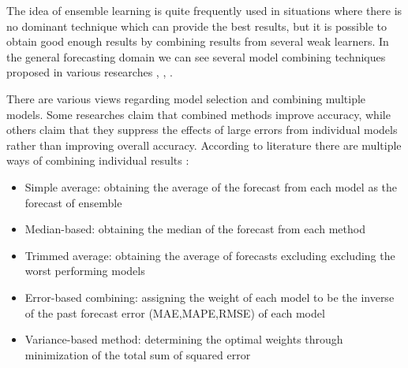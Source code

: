 The idea of ensemble learning is quite frequently used in situations where there is no dominant technique which can provide the best results, but it is possible to obtain good enough results by combining results from several weak learners. In the general forecasting domain we can see several model combining techniques proposed in various researches \cite{Zou_2004}, \cite{Wagner_2011},
\cite{Zhang_2003}.  

There are various views regarding model selection and combining multiple models. Some researches claim that combined methods improve accuracy, while others claim that they suppress the effects of large errors from individual models rather than improving overall accuracy. According to literature there are multiple ways of combining individual results \cite{Adhikari_2012}:

\begin{itemize}
\item Simple average: obtaining the average of the forecast from each model as the forecast of ensemble
\item Median-based:  obtaining the median of the forecast from each method
\item Trimmed average: obtaining the average of forecasts excluding  excluding the worst performing models
\item Error-based combining: assigning the weight of each model to be the inverse of the past forecast error (MAE,MAPE,RMSE) of each model
\item Variance-based method: determining the optimal weights through minimization of the total sum of squared error
\end{itemize}